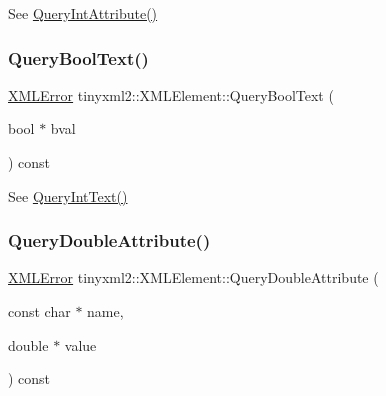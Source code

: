 See \mbox{\hyperlink{classtinyxml2_1_1_x_m_l_element_a8a78bc1187c1c45ad89f2690eab567b1}{Query\+Int\+Attribute()}} 

\mbox{\label{classtinyxml2_1_1_x_m_l_element_a3fe5417d59eb8f5c4afe924b7d332736}} 
\subsubsection{\texorpdfstring{Query\+Bool\+Text()}{QueryBoolText()}}
{\footnotesize\ttfamily \mbox{\hyperlink{namespacetinyxml2_a1fbf88509c3ac88c09117b1947414e08}{X\+M\+L\+Error}} tinyxml2\+::\+X\+M\+L\+Element\+::\+Query\+Bool\+Text (\begin{DoxyParamCaption}\item[{bool $\ast$}]{bval }\end{DoxyParamCaption}) const}



See \mbox{\hyperlink{classtinyxml2_1_1_x_m_l_element_a926357996bef633cb736e1a558419632}{Query\+Int\+Text()}} 

\mbox{\label{classtinyxml2_1_1_x_m_l_element_a5f0964e2dbd8e2ee7fce9beab689443c}} 
\subsubsection{\texorpdfstring{Query\+Double\+Attribute()}{QueryDoubleAttribute()}}
{\footnotesize\ttfamily \mbox{\hyperlink{namespacetinyxml2_a1fbf88509c3ac88c09117b1947414e08}{X\+M\+L\+Error}} tinyxml2\+::\+X\+M\+L\+Element\+::\+Query\+Double\+Attribute (\begin{DoxyParamCaption}\item[{const char $\ast$}]{name,  }\item[{double $\ast$}]{value }\end{DoxyParamCaption}) const\hspace{0.3cm}{\ttfamily [inline]}}



